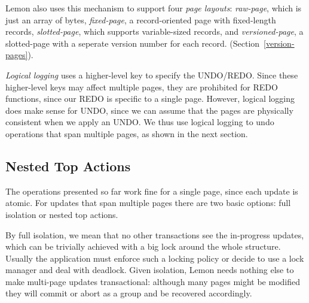 \documentclass[10pt,letterpaper,twocolumn,english]{article}
\newcommand{\yad}{Lemon\xspace}
\begin{document}

\yad also uses this mechanism to support four {\em page layouts}: 
{\em raw-page}, which is just an array of
bytes, {\em fixed-page}, a record-oriented page with fixed-length records,
{\em slotted-page}, which supports variable-sized records, and 
{\em versioned-page},  a slotted-page with a seperate version number for 
each record. (Section~\ref{version-pages}).  

{\em Logical logging} uses a higher-level key to specify the
UNDO/REDO.  Since these higher-level keys may affect multiple pages,
they are prohibited for REDO functions, since our REDO is specific to
a single page.  However, logical logging does make sense for UNDO,
since we can assume that the pages are physically consistent when we
apply an UNDO.  We thus use logical logging to undo operations that
span multiple pages, as shown in the next section.




\subsection{Nested Top Actions}
\label{nested-top-actions}

The operations presented so far work fine for a single page, since
each update is atomic.  For updates that span multiple pages there 
are two basic options: full isolation or nested top actions.

By full isolation, we mean that no other transactions see the
in-progress updates, which can be trivially achieved with a big lock
around the whole structure.  Usually the application must enforce 
such a locking policy or decide to use a lock manager and deal with 
deadlock.  Given isolation, \yad needs nothing else to
make multi-page updates transactional: although many pages might be
modified they will commit or abort as a group and be recovered
accordingly.
\end{document}
